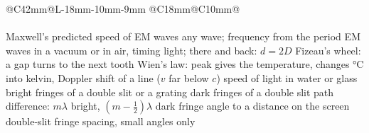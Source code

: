 {\small
\setlength\LTpre{4pt}\setlength\LTpost{6pt}
\renewcommand\arraystretch{1.0}
\begin{longtable}{@{}C{42mm}@{\hspace{3mm}}L{\dimexpr\linewidth-42mm-18mm-10mm-9mm\relax}%
    @{\hspace{3mm}}C{18mm}@{\hspace{3mm}}C{10mm}@{}}
  \essfshead\\\hline\endfirsthead
  \essfshead\\\hline\endhead
    {Maxwell's predicted speed of EM waves}{}
    {any wave; frequency from the period}{}
    {EM waves in a vacuum or in air}{, }
    {timing light; there and back: $d = 2D$}{}
    {Fizeau's wheel: a gap turns to the next tooth}{}
    {Wien's law: peak gives the temperature}{, }
    {changes \si{\degreeCelsius} into kelvin}{, }
    {Doppler shift of a line ($v$ far below $c$)}{}
  \essfsnext
    {speed of light in water or glass}{}
    {bright fringes of a double slit or a grating}{}
    {dark fringes of a double slit}{}
    {path difference: $m\lambda$ bright, $\left(m - \frac{1}{2}\right)\lambda$ dark}{}
    {fringe angle to a distance on the screen}{}
    {double-slit fringe spacing, small angles only}{}

\end{longtable}}
